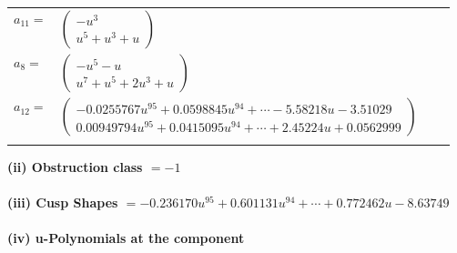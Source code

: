 \documentclass[1p]{elsarticle_modified}
\theoremstyle{definition}
\begin{document}
\begin{tabular}{m{7pt} m{180pt} m{7pt} m{180pt} }
\flushright $a_{11}=$&$\begin{pmatrix}- u^3\\u^5+u^3+u\end{pmatrix}$ \\
\flushright $a_{8}=$&$\begin{pmatrix}- u^5- u\\u^7+u^5+2 u^3+u\end{pmatrix}$ \\
\flushright $a_{12}=$&$\begin{pmatrix}-0.0255767 u^{95}+0.0598845 u^{94}+\cdots-5.58218 u-3.51029\\0.00949794 u^{95}+0.0415095 u^{94}+\cdots+2.45224 u+0.0562999\end{pmatrix}$\\&\end{tabular}
\flushleft \textbf{(ii) Obstruction class $= -1$}\\~\\
\flushleft \textbf{(iii) Cusp Shapes $= -0.236170 u^{95}+0.601131 u^{94}+\cdots+0.772462 u-8.63749$}\\~\\
\newpage\renewcommand{\arraystretch}{1}
\flushleft \textbf{(iv) u-Polynomials at the component}\newline \\
\end{document}

